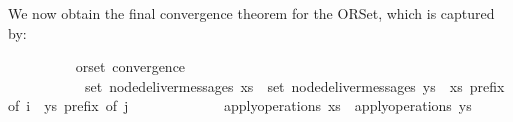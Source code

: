 We now obtain the final convergence theorem for the ORSet, which is captured by:
\vspace{0.35em}
\begin{isabellebody}
\ \ \ \ \ \ \ \  {\isacharparenleft}\ orset{\isacharparenright}\ convergence{\isacharcolon}\isanewline
\ \ \ \ \ \ \ \ \ \ \ {\isachardoublequoteopen}set\ {\isacharparenleft}node{\isacharunderscore}deliver{\isacharunderscore}messages\ xs{\isacharparenright}\ {\isacharequal}\ set\ {\isacharparenleft}node{\isacharunderscore}deliver{\isacharunderscore}messages\ ys{\isacharparenright}{\isachardoublequoteclose}\ \ {\isachardoublequoteopen}xs\ prefix\ of\ i{\isachardoublequoteclose}\ \ {\isachardoublequoteopen}ys\ prefix\ of\ j{\isachardoublequoteclose}\isanewline
\ \ \ \ \ \ \ \ \ \ \ \ \ {\isachardoublequoteopen}apply{\isacharunderscore}operations\ xs\ {\isacharequal}\ apply{\isacharunderscore}operations\ ys{\isachardoublequoteclose}
\end{isabellebody}
